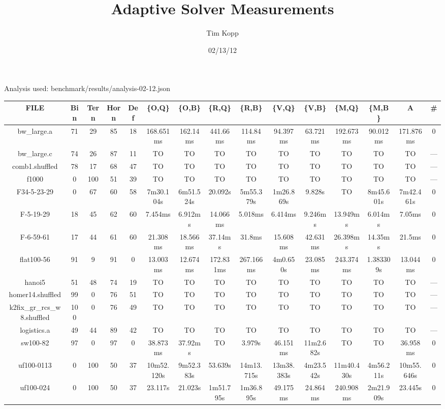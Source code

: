 \documentclass{article}
\title{Adaptive Solver Measurements}
\author{Tim Kopp}
\date{02/13/12}
\begin{document}
\maketitle

Analysis used: benchmark/results/analysis-02-12.json

\begin{table}[ht!]
\centering
\begin{tabular}{|c||c|c|c|c||c|c|c|c|c|c|c|c||c|c|}\hline
FILE & Bin & Tern & Horn & Def & \{O,Q\} & \{O,B\} & \{R,Q\} & \{R,B\} & \{V,Q\} & \{V,B\} & \{M,Q\} & \{M,B\} & A & \#\\\hline\hline
bw\_large.a & 71 & 29 & 85 & 18 & 168.651ms & 162.14ms & 441.66ms & 114.84ms & 94.397ms & 63.721ms & 192.673ms & 90.012ms & 171.876ms & 0\\\hline
bw\_large.c & 74 & 26 & 87 & 11 & TO & TO & TO & TO & TO & TO & TO & TO & TO & --- \\\hline
comb1.shuffled & 78 & 17 & 68 & 47 & TO & TO & TO & TO & TO & TO & TO & TO & TO & --- \\\hline
f1000 & 0 & 100 & 51 & 39 & TO & TO & TO & TO & TO & TO & TO & TO & TO & --- \\\hline
F34-5-23-29 & 0 & 67 & 60 & 58 & 7m30.104s & 6m51.524s & 20.092s & 5m55.379s & 1m26.869s & 9.828s & TO & 8m45.601s & 7m42.461s & 0\\\hline
F-5-19-29 & 18 & 45 & 62 & 60 & 7.454ms & 6.912ms & 14.066ms & 5.018ms & 6.414ms & 9.246ms & 13.949ms & 6.014ms & 7.05ms & 0\\\hline
F-6-59-61 & 17 & 44 & 61 & 60 & 21.308ms & 18.566ms & 37.14ms & 31.8ms & 15.608ms & 42.631ms & 26.398ms & 14.35ms & 21.5ms & 0\\\hline
flat100-56 & 91 & 9 & 91 & 0 & 13.003ms & 12.674ms & 172.831ms & 267.166ms & 4m0.650s & 23.085ms & 243.374ms & 1.383309s & 13.044ms & 0\\\hline
hanoi5 & 51 & 48 & 74 & 19 & TO & TO & TO & TO & TO & TO & TO & TO & TO & --- \\\hline
homer14.shuffled & 99 & 0 & 76 & 51 & TO & TO & TO & TO & TO & TO & TO & TO & TO & --- \\\hline
k2fix\_gr\_rcs\_w8.shuffled & 100 & 0 & 76 & 49 & TO & TO & TO & TO & TO & TO & TO & TO & TO & --- \\\hline
logistics.a & 49 & 44 & 89 & 42 & TO & TO & TO & TO & TO & TO & TO & TO & TO & --- \\\hline
sw100-82 & 97 & 0 & 97 & 0 & 38.873ms & 37.92ms & TO & 3.979s & 46.151ms & 11m2.682s & TO & TO & 36.958ms & 0\\\hline
uf100-0113 & 0 & 100 & 50 & 37 & 10m52.120s & 9m52.383s & 53.639s & 14m13.715s & 13m38.383s & 4m23.542s & 11m40.430s & 4m56.211s & 10m55.646s & 0\\\hline
uf100-024 & 0 & 100 & 50 & 37 & 23.117s & 21.023s & 1m51.795s & 1m36.895s & 49.175ms & 24.864ms & 240.908ms & 2m21.909s & 23.445s & 0\\\hline
\end{tabular}
\end{table}
\end{document}
